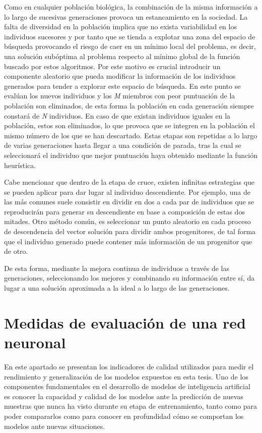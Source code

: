 Como en cualquier población biológica, la combinación  de la misma información a lo largo de sucesivas generaciones provoca un estancamiento en la sociedad. La falta de diversidad en la población implica que no exista variabilidad en los individuos sucesores y por tanto que se tienda a explotar una zona del espacio de búsqueda provocando el riesgo de caer en un mínimo local del problema, es decir, una solución subóptima al problema respecto al mínimo global de la función buscado por estos algoritmos. Por este motivo es crucial introducir un componente aleatorio que pueda modificar la información de los individuos generados para tender a explorar este espacio de búsqueda. En este punto se evalúan los nuevos individuos y los \textit{M} miembros con peor puntuación de la población son eliminados, de esta forma la población en cada generación siempre constará de \textit{N} individuos. En caso de que existan individuos iguales en la población, estos son eliminados, lo que provoca que se integren en la población el mismo número de los que se han descartado. Estas etapas son repetidas a lo largo de varias generaciones hasta llegar a una condición de parada, tras la cual se seleccionará el individuo que mejor puntuación haya obtenido mediante la función heurística.

Cabe mencionar que dentro de la etapa de cruce, existen infinitas estrategias que se pueden aplicar para dar lugar al individuo descendiente. Por ejemplo, una de las más comunes suele consistir en dividir en dos a cada par de individuos que se reproducirán para generar su descendiente en base a composición de estas dos mitades. Otro método común, es seleccionar un punto aleatorio en cada proceso de descendencia del vector solución para dividir ambos progenitores, de tal forma que el individuo generado puede contener más información de un progenitor que de otro.


De esta forma, mediante la mejora continua de individuos a través de las generaciones, seleccionando los mejores y combinando su información entre sí, da lugar a una solución aproximada a la ideal a lo largo de las generaciones.

\section{Medidas de evaluación de una red neuronal}

En este apartado se presentan los indicadores de calidad utilizados para medir el rendimiento y generalización de los modelos expuestos en esta tesis. Uno de los componentes fundamentales en el desarrollo de modelos de inteligencia artificial es conocer la capacidad y calidad de los modelos ante la predicción de nuevas muestras que nunca ha visto durante su etapa de entrenamiento, tanto como para poder compararlos como para conocer en profundidad cómo se comportan los modelos ante nuevas situaciones.


